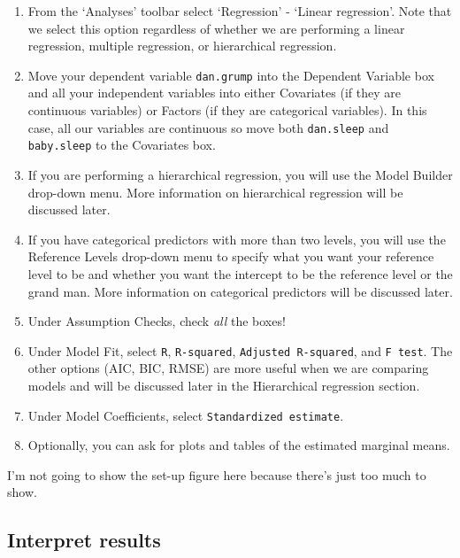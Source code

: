\documentclass[
]{book}
\begin{document}
\begin{enumerate}
\def\labelenumi{\arabic{enumi}.}
\item
  From the `Analyses' toolbar select `Regression' - `Linear regression'. Note that we select this option regardless of whether we are performing a linear regression, multiple regression, or hierarchical regression.
\item
  Move your dependent variable \texttt{dan.grump} into the Dependent Variable box and all your independent variables into either Covariates (if they are continuous variables) or Factors (if they are categorical variables). In this case, all our variables are continuous so move both \texttt{dan.sleep} and \texttt{baby.sleep} to the Covariates box.
\item
  If you are performing a hierarchical regression, you will use the Model Builder drop-down menu. More information on hierarchical regression will be discussed later.
\item
  If you have categorical predictors with more than two levels, you will use the Reference Levels drop-down menu to specify what you want your reference level to be and whether you want the intercept to be the reference level or the grand man. More information on categorical predictors will be discussed later.
\item
  Under Assumption Checks, check \emph{all} the boxes!
\item
  Under Model Fit, select \texttt{R}, \texttt{R-squared}, \texttt{Adjusted\ R-squared}, and \texttt{F\ test}. The other options (AIC, BIC, RMSE) are more useful when we are comparing models and will be discussed later in the Hierarchical regression section.
\item
  Under Model Coefficients, select \texttt{Standardized\ estimate}.
\item
  Optionally, you can ask for plots and tables of the estimated marginal means.
\end{enumerate}

I'm not going to show the set-up figure here because there's just too much to show.

\hypertarget{interpret-results-6}{%
\subsection{Interpret results}\label{interpret-results-6}}
\end{document}
